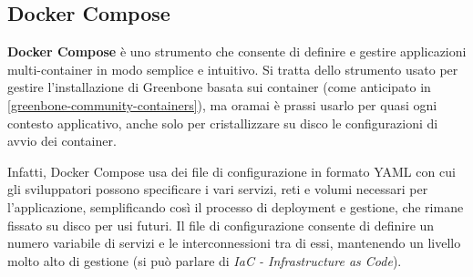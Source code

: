 \subsection{Docker Compose}
\label{docker-compose}
\textbf{Docker Compose} è uno strumento che consente di definire e gestire applicazioni multi-container in modo semplice e intuitivo. Si tratta dello strumento usato per gestire l'installazione di Greenbone basata sui container (come anticipato in \ref{greenbone-community-containers}), ma oramai è prassi usarlo per quasi ogni contesto applicativo, anche solo per cristallizzare su disco le configurazioni di avvio dei container.

Infatti, Docker Compose usa dei file di configurazione in formato YAML con cui gli sviluppatori possono specificare i vari servizi, reti e volumi necessari per l'applicazione, semplificando così il processo di deployment e gestione, che rimane fissato su disco per usi futuri. Il file di configurazione consente di definire un numero variabile di servizi e le interconnessioni tra di essi, mantenendo un livello molto alto di gestione (si può parlare di \emph{IaC - Infrastructure as Code}).